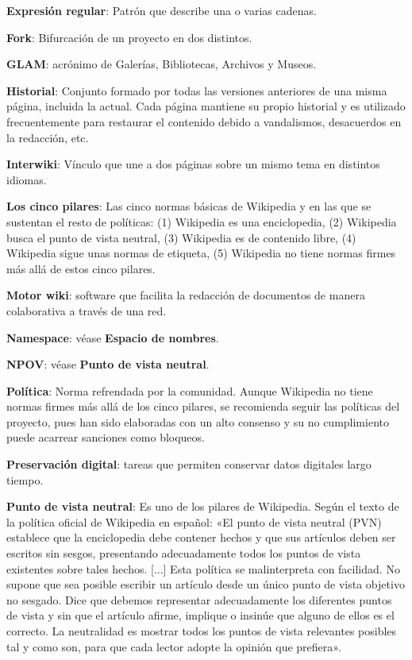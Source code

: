\documentclass[11pt,onecolumn]{article}
\begin{document}
\textbf{Expresión regular}: Patrón que describe una o varias cadenas.

\textbf{Fork}: Bifurcación de un proyecto en dos distintos.

\textbf{GLAM}: acrónimo de Galerías, Bibliotecas, Archivos y Museos.

\textbf{Historial}: Conjunto formado por todas las versiones anteriores de una misma página, incluida la actual. Cada página mantiene su propio historial y es utilizado frecuentemente para restaurar el contenido debido a vandalismos, desacuerdos en la redacción, etc.

\textbf{Interwiki}: Vínculo que une a dos páginas sobre un mismo tema en distintos idiomas.

\textbf{Los cinco pilares}: Las cinco normas básicas de Wikipedia y en las que se sustentan el resto de políticas: (1) Wikipedia es una enciclopedia, (2) Wikipedia busca el punto de vista neutral, (3) Wikipedia es de contenido libre, (4) Wikipedia sigue unas normas de etiqueta, (5) Wikipedia no tiene normas firmes más allá de estos cinco pilares.

\textbf{Motor wiki}: software que facilita la redacción de documentos de manera colaborativa a través de una red.

\textbf{Namespace}: véase \textbf{Espacio de nombres}.

\textbf{NPOV}: véase \textbf{Punto de vista neutral}.

\textbf{Política}: Norma refrendada por la comunidad. Aunque Wikipedia no tiene normas firmes más allá de los cinco pilares, se recomienda seguir las políticas del proyecto, pues han sido elaboradas con un alto consenso y su no cumplimiento puede acarrear sanciones como bloqueos.

\textbf{Preservación digital}: tareas que permiten conservar datos digitales largo tiempo.

\textbf{Punto de vista neutral}: Es uno de los pilares de Wikipedia. Según el texto de la política oficial de Wikipedia en español: «El punto de vista neutral (PVN) establece que la enciclopedia debe contener hechos y que sus artículos deben ser escritos sin sesgos, presentando adecuadamente todos los puntos de vista existentes sobre tales hechos. [...] Esta política se malinterpreta con facilidad. No supone que sea posible escribir un artículo desde un único punto de vista objetivo no sesgado. Dice que debemos representar adecuadamente los diferentes puntos de vista y sin que el artículo afirme, implique o insinúe que alguno de ellos es el correcto. La neutralidad es mostrar todos los puntos de vista relevantes posibles tal y como son, para que cada lector adopte la opinión que prefiera».
\end{document}
